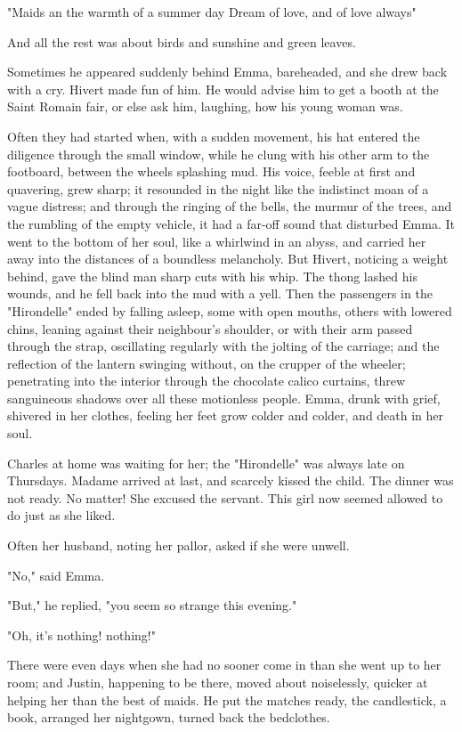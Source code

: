 \documentclass{tufte-book}
\begin{document}
"Maids an the warmth of a summer day Dream of love, and of love always"

And all the rest was about birds and sunshine and green leaves.

Sometimes he appeared suddenly behind Emma, bareheaded, and she drew
back with a cry. Hivert made fun of him. He would advise him to get a
booth at the Saint Romain fair, or else ask him, laughing, how his young
woman was.

Often they had started when, with a sudden movement, his hat entered the
diligence through the small window, while he clung with his other arm
to the footboard, between the wheels splashing mud. His voice, feeble
at first and quavering, grew sharp; it resounded in the night like the
indistinct moan of a vague distress; and through the ringing of the
bells, the murmur of the trees, and the rumbling of the empty vehicle,
it had a far-off sound that disturbed Emma. It went to the bottom of
her soul, like a whirlwind in an abyss, and carried her away into the
distances of a boundless melancholy. But Hivert, noticing a weight
behind, gave the blind man sharp cuts with his whip. The thong lashed
his wounds, and he fell back into the mud with a yell. Then the
passengers in the "Hirondelle" ended by falling asleep, some with open
mouths, others with lowered chins, leaning against their neighbour's
shoulder, or with their arm passed through the strap, oscillating
regularly with the jolting of the carriage; and the reflection of the
lantern swinging without, on the crupper of the wheeler; penetrating
into the interior through the chocolate calico curtains, threw
sanguineous shadows over all these motionless people. Emma, drunk with
grief, shivered in her clothes, feeling her feet grow colder and colder,
and death in her soul.

Charles at home was waiting for her; the "Hirondelle" was always late
on Thursdays. Madame arrived at last, and scarcely kissed the child. The
dinner was not ready. No matter! She excused the servant. This girl now
seemed allowed to do just as she liked.

Often her husband, noting her pallor, asked if she were unwell.

"No," said Emma.

"But," he replied, "you seem so strange this evening."

"Oh, it's nothing! nothing!"

There were even days when she had no sooner come in than she went up to
her room; and Justin, happening to be there, moved about noiselessly,
quicker at helping her than the best of maids. He put the matches
ready, the candlestick, a book, arranged her nightgown, turned back the
bedclothes.
\end{document}
